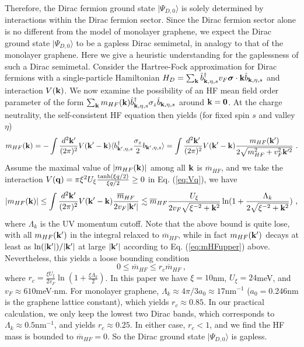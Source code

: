 \documentclass[prb,aps,nofootinbib,amssymb,twocolumn,superscriptaddress,10pt]{revtex4-2}
\begin{document}
\begin{widetext}
Therefore, the Dirac fermion ground state $|\Psi_{D,0}\rangle$ is solely determined by interactions within the Dirac fermion sector. Since the Dirac fermion sector alone is no different from the model of monolayer graphene, we expect the Dirac ground state $|\Psi_{D,0}\rangle$ to be a gapless Dirac semimetal, in analogy to that of the monolayer graphene. Here we give a heuristic understanding for the gaplessness of such a Dirac semimetal. Consider the Hartree-Fock approximation for Dirac fermions with a single-particle Hamiltonian $H_D=\sum_\mathbf{k}\hat{b}^\dag_{\mathbf{k},\eta,s} v_F\bm{\sigma}\cdot\mathbf{k} \hat{b}_{\mathbf{k},\eta,s}$ and interaction $V(\mathbf{k})$. We now examine the possibility of an HF mean field order parameter of the form $\sum_{\mathbf{k}} m_{HF}(\mathbf{k})\hat{b}_{\mathbf{k},\eta,s}^\dag\sigma_z\hat{b}_{\mathbf{k},\eta,s}$ around $\mathbf{k}=\mathbf{0}$. At the charge neutrality, the self-consistent HF equation then yields (for fixed spin $s$ and valley $\eta$)
\begin{equation}\label{seq:mHFself}
m_{HF}(\vk)=-\int \frac{d^2\vk'}{(2\pi)^2}V(\vk'-\vk)\langle b_{\vk',\eta,s}^\dag \frac{\sigma_z}{2}b_{\vk',\eta,s}\rangle =\int \frac{d^2\vk'}{(2\pi)^2}V(\vk'-\vk)\frac{m_{HF}(\vk')}{2\sqrt{m_{HF}^2+v_F^2\vk'^2}}\ .
\end{equation}
Assume the maximal value of $|m_{HF}(\mathbf{k})|$ among all $\mathbf{k}$ is $\overline{m}_{HF}$, and we take the interaction $V(\mathbf{q}) = \pi\xi^2U_\xi\frac{\tanh(\xi q/2)}{\xi q/2}\ge0$ in Eq. (\ref{eq:Vq}), we have
\begin{equation}\label{eq:mHFupper}
|m_{HF}(\vk)|\le \int \frac{d^2\vk'}{(2\pi)^2}V(\vk'-\vk)\frac{\overline{m}_{HF}}{2v_F|\vk'|}\lesssim \overline{m}_{HF} \frac{ U_\xi}{2v_F \sqrt{\xi^{-2}+\vk^2}}\ln(1+\frac{\Lambda_k}{2\sqrt{\xi^{-2}+\vk^2}})  \ ,
\end{equation}
where $\Lambda_k$ is the UV momentum cutoff. Note that the above bound is quite lose, with all $m_{HF}(\mathbf{k}')$ in the integral relaxed to $\overline{m}_{HF}$, while in fact $m_{HF}(\mathbf{k}')$ decays at least as $\ln(|\mathbf{k}'|)/|\mathbf{k}'|$ at large $|\mathbf{k}'|$ according to Eq. (\ref{eq:mHFupper}) above. 
Nevertheless, this yields a loose bounding condition
\begin{equation}
0\le \overline{m}_{HF} \le r_c \overline{m}_{HF}\ ,
\end{equation}
where $r_c= \frac{ \xi U_\xi}{2v_F}\ln(1+\frac{\xi\Lambda_k}{2})$. In this paper we have $\xi=10$nm, $U_\xi=24$meV, and $v_F\approx610$meV$\cdot$nm. 
For monolayer graphene, $\Lambda_k\approx 4\pi/3a_0\approx17$nm$^{-1}$ ($a_0=0.246$nm is the graphene lattice constant), which yields $r_c\approx 0.85$. In our practical calculation, we only keep the lowest two Dirac bands, which corresponds to $\Lambda_k\approx 0.5$nm$^{-1}$, and yields $r_c\approx0.25$. In either case, $r_c<1$, and we find the HF mass is bounded to $\overline{m}_{HF}=0$. So the Dirac ground state $|\Psi_{D,0}\rangle$ is gapless.


\end{widetext}
\end{document}
